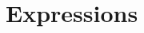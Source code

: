 %
%
%
%

\chapter{Expressions}

% 
% 
% 
% 
% 
% 
% 
% 
% 
% 
% 
% 
% 
% 
% 
% 
% 
% 
% 
% 
% 
% 
% 
% 
% 
% 
% 
% 
% 
% 
